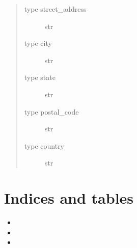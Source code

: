 \documentclass[letterpaper,10pt,english]{sphinxmanual}
\begin{document}
\begin{fulllineitems}
\begin{description}
\begin{quote}
\begin{description}
\item[{type street\_address}] \leavevmode
str

\item[{type city}] \leavevmode
str

\item[{type state}] \leavevmode
str

\item[{type postal\_code}] \leavevmode
str

\item[{type country}] \leavevmode
str

\end{description}\end{quote}

\end{description}

\end{fulllineitems}



\chapter{Indices and tables}
\label{\detokenize{index:indices-and-tables}}\begin{itemize}
\item {} 

\item {} 

\item {} 

\end{itemize}


\renewcommand{\indexname}{Python Module Index}
\begin{sphinxtheindex}
\let\bigletter\sphinxstyleindexlettergroup
\bigletter{m}
\item\relax{}
\item\relax{}
\item\relax{}
\indexspace
\bigletter{v}
\item\relax{}
\item\relax{}
\end{sphinxtheindex}

\renewcommand{\indexname}{Index}
\printindex
\end{document}
